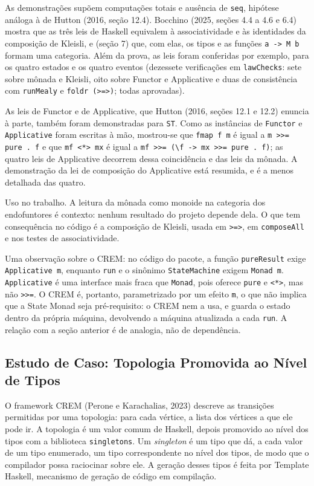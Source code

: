 \documentclass[12pt,a4paper]{article}
\begin{document}
As demonstrações supõem computações totais e ausência de \texttt{seq}, hipótese análoga à de Hutton (2016, seção 12.4). Bocchino (2025, seções 4.4 a 4.6 e 6.4) mostra que as três leis de Haskell equivalem à associatividade e às identidades da composição de Kleisli, e (seção 7) que, com elas, os tipos e as funções \texttt{a -> M b} formam uma categoria. Além da prova, as leis foram conferidas por exemplo, para os quatro estados e os quatro eventos (dezessete verificações em \texttt{lawChecks}: sete sobre mônada e Kleisli, oito sobre Functor e Applicative e duas de consistência com \texttt{runMealy} e \texttt{foldr (>=>)}; todas aprovadas).

As leis de Functor e de Applicative, que Hutton (2016, seções 12.1 e 12.2) enuncia à parte, também foram demonstradas para \texttt{ST}. Como as instâncias de \texttt{Functor} e \texttt{Applicative} foram escritas à mão, mostrou-se que \texttt{fmap f m} é igual a \texttt{m >>= pure . f} e que \texttt{mf <*> mx} é igual a \texttt{mf >>= (\textbackslash f -> mx >>= pure . f)}; as quatro leis de Applicative decorrem dessa coincidência e das leis da mônada. A demonstração da lei de composição do Applicative está resumida, e é a menos detalhada das quatro.

Uso no trabalho. A leitura da mônada como monoide na categoria dos endofuntores é contexto: nenhum resultado do projeto depende dela. O que tem consequência no código é a composição de Kleisli, usada em \texttt{>=>}, em \texttt{composeAll} e nos testes de associatividade.

Uma observação sobre o CREM: no código do pacote, a função \texttt{pureResult} exige \texttt{Applicative m}, enquanto \texttt{run} e o sinônimo \texttt{StateMachine} exigem \texttt{Monad m}. \texttt{Applicative} é uma interface mais fraca que \texttt{Monad}, pois oferece \texttt{pure} e \texttt{<*>}, mas não \texttt{>>=}. O CREM é, portanto, parametrizado por um efeito \texttt{m}, o que não implica que a State Monad seja pré-requisito: o CREM nem a usa, e guarda o estado dentro da própria máquina, devolvendo a máquina atualizada a cada \texttt{run}. A relação com a seção anterior é de analogia, não de dependência.

\subsection{Estudo de Caso: Topologia Promovida ao Nível de Tipos}

O framework CREM (Perone e Karachalias, 2023) descreve as transições permitidas por uma topologia: para cada vértice, a lista dos vértices a que ele pode ir. A topologia é um valor comum de Haskell, depois promovido ao nível dos tipos com a biblioteca \texttt{singletons}. Um \textit{singleton} é um tipo que dá, a cada valor de um tipo enumerado, um tipo correspondente no nível dos tipos, de modo que o compilador possa raciocinar sobre ele. A geração desses tipos é feita por Template Haskell, mecanismo de geração de código em compilação.
\end{document}
